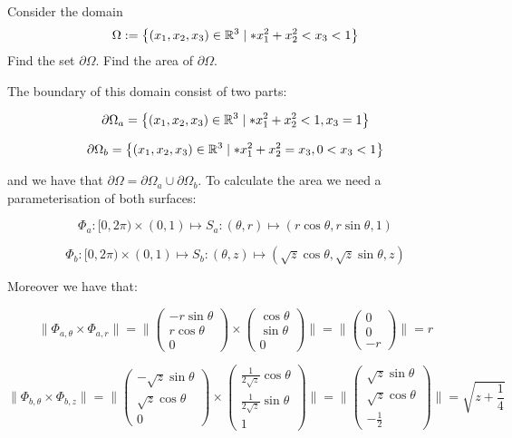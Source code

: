 \documentclass[11pt]{article}
\begin{document}
\begin{exercise}
    Consider the domain 
    \begin{gather*}
        \Omega := \left\{ (x_1,x_2,x_3) \in \mathbb R^3 \suchthat* x_1^2 + x_2^2 < x_3 < 1 \right\}
    \end{gather*}
    Find the set $\partial\Omega$. Find the area of $\partial\Omega$. 
\end{exercise}
\begin{solution} 
The boundary of this domain consist of two parts:

$$
\partial \Omega_a =\left\{ (x_1,x_2,x_3) \in \mathbb R^3 \suchthat* x_1^2 + x_2^2 < 1, x_3 = 1 \right\} 
$$

$$
\partial \Omega_b =\left\{ (x_1,x_2,x_3) \in \mathbb R^3 \suchthat* x_1^2 + x_2^2 = x_3, 0<x_3<1 \right\} 
$$

and we have that $\partial \Omega = \partial \Omega_a \cup \partial \Omega_b$. To calculate the area we need a parameterisation of both surfaces:

$$
\Phi_a: [0,2\pi) \times (0,1) \mapsto S_a: (\theta,r)\mapsto (r\cos\theta, r\sin\theta,1)
$$

$$
\Phi_b: [0,2\pi) \times (0,1) \mapsto S_b: (\theta,z)\mapsto (\sqrt{z}\cos\theta, \sqrt{z}\sin\theta,z)
$$

Moreover we have that:

$$
\|\Phi_{a,\theta}\times \Phi_{a,r}\|  = \|\begin{pmatrix} -r\sin\theta \\ r\cos\theta\\0 \end{pmatrix} \times \begin{pmatrix} \cos\theta \\ \sin\theta \\0 \end{pmatrix}\| = \|\begin{pmatrix} 0 \\ 0 \\ -r \end{pmatrix}\| = r
$$

$$
\|\Phi_{b,\theta}\times \Phi_{b,z}\|  = \|\begin{pmatrix} -\sqrt{z}\sin\theta \\ \sqrt{z}\cos\theta\\0 \end{pmatrix} \times \begin{pmatrix} \frac{1}{2\sqrt{z}}\cos\theta \\  \frac{1}{2\sqrt{z}}\sin\theta \\1 \end{pmatrix}\| = \|\begin{pmatrix} \sqrt{z}\sin\theta \\ \sqrt{z}\cos\theta\\-\frac{1}{2} \end{pmatrix}\| = \sqrt{z+\frac{1}{4}}
$$


\end{solution}
\end{document}
